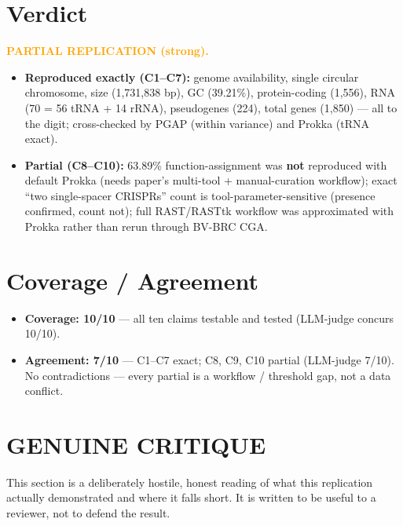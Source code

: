 \documentclass[11pt]{article}
\begin{document}
\section{Verdict}

\textcolor{orange}{\textbf{PARTIAL REPLICATION (strong).}}

\begin{itemize}[leftmargin=*, itemsep=2pt]
  \item \textbf{Reproduced exactly (C1--C7):} genome availability, single circular chromosome,
  size (1{,}731{,}838 bp), GC (39.21\%), protein-coding (1{,}556), RNA (70 = 56 tRNA + 14 rRNA),
  pseudogenes (224), total genes (1{,}850) --- all to the digit; cross-checked by PGAP
  (within variance) and Prokka (tRNA exact).
  \item \textbf{Partial (C8--C10):} 63.89\% function-assignment was \textbf{not} reproduced with
  default Prokka (needs paper's multi-tool + manual-curation workflow); exact ``two single-spacer
  CRISPRs'' count is tool-parameter-sensitive (presence confirmed, count not); full RAST/RASTtk
  workflow was approximated with Prokka rather than rerun through BV-BRC CGA.
\end{itemize}

\section{Coverage / Agreement}

\begin{itemize}[leftmargin=*, itemsep=2pt]
  \item \textbf{Coverage: 10/10} --- all ten claims testable and tested (LLM-judge concurs 10/10).
  \item \textbf{Agreement: 7/10} --- C1--C7 exact; C8, C9, C10 partial (LLM-judge 7/10). No
  contradictions --- every partial is a workflow / threshold gap, not a data conflict.
\end{itemize}

\section{GENUINE CRITIQUE}

This section is a deliberately hostile, honest reading of what this replication actually
demonstrated and where it falls short. It is written to be useful to a reviewer, not to defend the
result.
\end{document}
